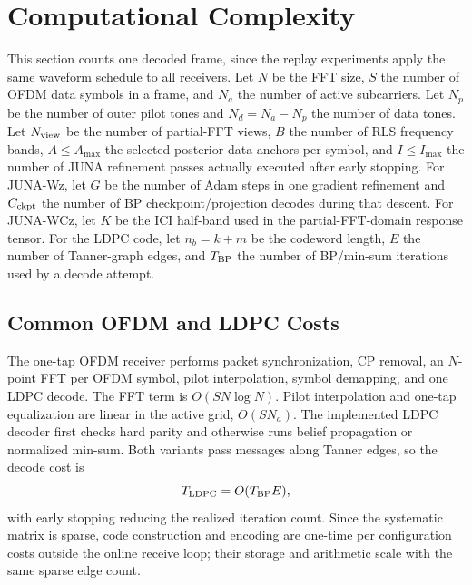 \documentclass[journal]{IEEEtran}
\newcommand{\juna}{JUNA}
\newcommand{\junawz}{JUNA-Wz}
\newcommand{\junawcz}{JUNA-WCz}
\begin{document}
\section{Computational Complexity}\label{sec:complexity}
This section counts one decoded frame, since the replay experiments apply the
same waveform schedule to all receivers. Let $N$ be the FFT size, $S$ the number
of OFDM data symbols in a frame, and $N_a$ the number of active subcarriers. Let
$N_p$ be the number of outer pilot tones and $N_d=N_a-N_p$ the number of data
tones. Let
$N_{\rm view}$ be the number of partial-FFT views, $B$ the number of RLS frequency
bands, $A\le A_{\max}$ the selected posterior data anchors per symbol, and
$I\le I_{\max}$ the number of \juna{} refinement passes actually executed after
early stopping. For \junawz{}, let $G$ be the number of Adam steps in one
gradient refinement and $C_{\rm ckpt}$ the number of BP checkpoint/projection
decodes during that descent. For \junawcz{}, let $K$ be the ICI half-band used in
the partial-FFT-domain response tensor. For the LDPC code, let $n_b=k+m$ be the codeword length, $E$ the
number of Tanner-graph edges, and $T_{\rm BP}$ the number of BP/min-sum
iterations used by a decode attempt.

\subsection{Common OFDM and LDPC Costs}
The one-tap OFDM receiver performs packet synchronization, CP removal, an
$N$-point FFT per OFDM symbol, pilot interpolation, symbol demapping, and one
LDPC decode. The FFT term is $O(SN\log N)$. Pilot interpolation and one-tap
equalization are linear in the active grid, $O(SN_a)$. The implemented LDPC
decoder first checks hard parity and otherwise runs belief propagation or
normalized min-sum. Both variants pass messages along Tanner edges, so the
decode cost is
\begin{equation}
  T_{\rm LDPC}=O(T_{\rm BP}E),
  \label{eq:ldpc-complexity}
\end{equation}
with early stopping reducing the realized iteration count. Since the systematic
matrix is sparse, code construction and encoding are one-time per configuration
costs outside the online receive loop; their storage and arithmetic scale with
the same sparse edge count.
\end{document}
